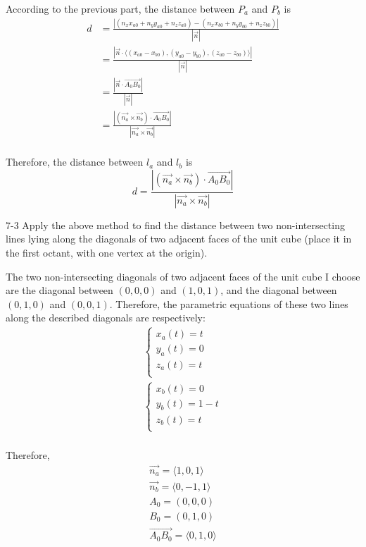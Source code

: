 \documentclass{article}
\begin{document}
According to the previous part, the distance between $P_a$ and $P_b$ is
\begin{equation*}
  \begin{split}
    d &= \frac{|(n_x x_{a0} + n_y y_{a0} + n_z z_{a0}) - (n_x x_{b0} + n_y y_{b0} + n_z z_{b0})|}{|\vec{n}|} \\
      &= \frac{|\vec{n} \cdot \langle (x_{a0} - x_{b0}), (y_{a0} - y_{b0}), (z_{a0} - z_{b0}) \rangle|}{|\vec{n}|} \\
      &= \frac{|\vec{n} \cdot \vec{A_0B_0}|}{|\vec{n}|} \\
      &= \frac{|(\vec{n_a} \times \vec{n_b}) \cdot \vec{A_0B_0}|}{|\vec{n_a} \times \vec{n_b}|} \\
  \end{split}
\end{equation*}

Therefore, the distance between $l_a$ and $l_b$ is
\begin{equation*}
  d = \frac{|(\vec{n_a} \times \vec{n_b}) \cdot \vec{A_0B_0}|}{|\vec{n_a} \times \vec{n_b}|}
\end{equation*}

7-3 Apply the above method to find the distance between two non-intersecting 
lines lying along the diagonals of two adjacent faces of the unit cube (place it 
in the first octant, with one vertex at the origin).

The two non-intersecting diagonals of two adjacent faces of the unit cube I 
choose are the diagonal between $(0, 0, 0)$ and $(1, 0, 1)$, and the diagonal 
between $(0, 1, 0)$ and $(0, 0, 1)$. Therefore, the parametric equations of 
these two lines along the described diagonals are respectively:
\begin{gather*}
  \begin{cases}
    x_a(t) = t \\
    y_a(t) = 0 \\
    z_a(t) = t \\
  \end{cases} \\
  \begin{cases}
    x_b(t) = 0 \\
    y_b(t) = 1 - t \\
    z_b(t) = t \\
  \end{cases} \\
\end{gather*}

Therefore,
\begin{gather*}
  \vec{n_a} = \langle 1, 0, 1 \rangle \\
  \vec{n_b} = \langle 0, -1, 1 \rangle \\
  A_0 = (0, 0, 0) \\
  B_0 = (0, 1, 0) \\
  \vec{A_0B_0} = \langle 0, 1, 0 \rangle \\
\end{gather*}
\end{document}
